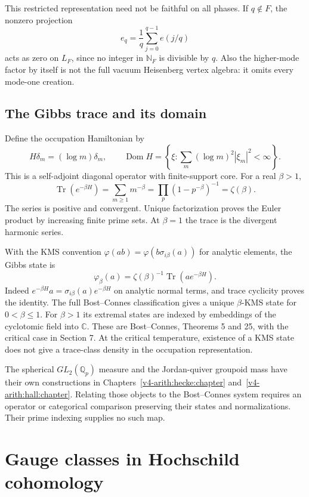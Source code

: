 This restricted representation need not be faithful on all phases. If
$q\notin F$, the nonzero projection
\[
 e_q=\frac1q\sum_{j=0}^{q-1}e(j/q)
\]
acts as zero on $L_F$, since no integer in $\mathbb N_F$ is divisible by
$q$. Also the higher-mode factor by itself is not the full vacuum Heisenberg
vertex algebra: it omits every mode-one creation.

\subsection{The Gibbs trace and its domain}

Define the occupation Hamiltonian by
\[
 H\delta_m=(\log m)\delta_m,\qquad
 \operatorname{Dom}H
  =\left\{\xi:\sum_m(\log m)^2|\xi_m|^2<\infty\right\}.
\]
This is a self-adjoint diagonal operator with finite-support core. For a
real $\beta>1$,
\begin{equation}
\label{v4-arith:traces:gibbs-zeta}
 \operatorname{Tr}(e^{-\beta H})
   =\sum_{m\geq1}m^{-\beta}
   =\prod_p(1-p^{-\beta})^{-1}
   =\zeta(\beta).
\end{equation}
The series is positive and convergent. Unique factorization proves the Euler
product by increasing finite prime sets. At $\beta=1$ the trace is the
divergent harmonic series.

With the KMS convention $\varphi(ab)=\varphi(b\sigma_{i\beta}(a))$ for
analytic elements, the Gibbs state is
\[
 \varphi_\beta(a)
   =\zeta(\beta)^{-1}\operatorname{Tr}(a e^{-\beta H}).
\]
Indeed $e^{-\beta H}a=\sigma_{i\beta}(a)e^{-\beta H}$ on analytic normal
terms, and trace cyclicity proves the identity. The full Bost--Connes
classification gives a unique $\beta$-KMS state for $0<\beta\leq1$. For
$\beta>1$ its extremal states are indexed by embeddings of the cyclotomic
field into $\mathbb C$. These are Bost--Connes, Theorems 5 and 25, with the
critical case in Section 7. At the critical temperature, existence of a KMS
state does not give a trace-class density in the occupation representation.

The spherical $GL_2(\mathbb Q_p)$ measure and the Jordan-quiver groupoid
mass have their own constructions in Chapters~\ref{v4-arith:hecke:chapter}
and~\ref{v4-arith:hall:chapter}. Relating those objects to the Bost--Connes
system requires an operator or categorical comparison preserving their
states and normalizations. Their prime indexing supplies no such map.

\section{Gauge classes in Hochschild cohomology}

